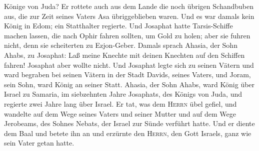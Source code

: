 Könige von Juda?  Er rottete auch aus dem Lande die noch
übrigen Schandbuben aus, die zur Zeit seines Vaters Asa übriggeblieben
waren.  Und es war damals kein König in Edom; ein
Statthalter regierte.  Und Josaphat hatte Tarsis-Schiffe
machen lassen, die nach Ophir fahren sollten, um Gold zu holen; aber sie
fuhren nicht, denn sie scheiterten zu Ezjon-Geber. 
Damals sprach Ahasia, der Sohn Ahabs, zu Josaphat: Laß meine Knechte mit
deinen Knechten auf den Schiffen fahren! Josaphat aber wollte nicht.
 Und Josaphat legte sich zu seinen Vätern und ward
begraben bei seinen Vätern in der Stadt Davids, seines Vaters, und
Joram, sein Sohn, ward König an seiner Statt.  Ahasia,
der Sohn Ahabs, ward König über Israel zu Samaria, im siebzehnten Jahre
Josaphats, des Königs von Juda, und regierte zwei Jahre lang über
Israel.  Er tat, was dem \textsc{Herrn} übel gefiel, und
wandelte auf dem Wege seines Vaters und seiner Mutter und auf dem Wege
Jerobeams, des Sohnes Nebats, der Israel zur Sünde verführt hatte.
 Und er diente dem Baal und betete ihn an und erzürnte
den \textsc{Herrn}, den Gott Israels, ganz wie sein Vater getan hatte.
